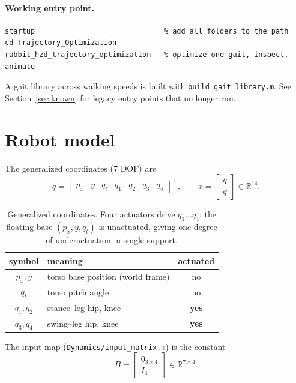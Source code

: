 \documentclass[11pt,a4paper]{article}
\newcommand{\fname}[1]{\texttt{#1}}          %
\begin{document}
\paragraph{Working entry point.}
\begin{lstlisting}
startup                              % add all folders to the path
cd Trajectory_Optimization
rabbit_hzd_trajectory_optimization   % optimize one gait, inspect, animate
\end{lstlisting}
A gait library across walking speeds is built with \fname{build\_gait\_library.m}.
See Section~\ref{sec:known} for legacy entry points that no longer run.

\section{Robot model}
The generalized coordinates (7 DOF) are
\begin{equation}
  q = \begin{bmatrix} p_x & y & q_t & q_1 & q_2 & q_3 & q_4 \end{bmatrix}^{\!\top},
  \qquad
  x = \begin{bmatrix} q \\ \dot q \end{bmatrix} \in \mathbb{R}^{14}.
\end{equation}

\begin{table}[h]
\centering
\begin{tabular}{@{}clc@{}}
\toprule
symbol & meaning & actuated \\
\midrule
$p_x, y$   & torso base position (world frame) & no \\
$q_t$      & torso pitch angle                 & no \\
$q_1, q_2$ & stance--leg hip, knee             & \textbf{yes} \\
$q_3, q_4$ & swing--leg hip, knee              & \textbf{yes} \\
\bottomrule
\end{tabular}
\caption{Generalized coordinates. Four actuators drive $q_1\dots q_4$; the
floating base $(p_x,y,q_t)$ is unactuated, giving one degree of
underactuation in single support.}
\end{table}

The input map (\fname{Dynamics/input\_matrix.m}) is the constant
\begin{equation}
  B = \begin{bmatrix} 0_{3\times 4} \\ I_{4} \end{bmatrix} \in \mathbb{R}^{7\times 4}.
\end{equation}
\end{document}
